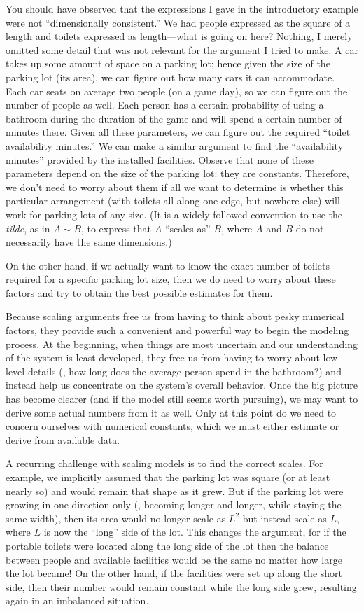 You should have observed that the expressions I gave in the
introductory example were not ``dimensionally consistent.'' We had
people expressed\vadjust{\pagebreak} as the square of a length and toilets expressed as
length---what is going on here?  Nothing, I merely omitted some detail
that was not relevant for the argument I tried to make. A car takes up
some amount of space on a parking lot; hence given the size of the
parking lot (its area), we can figure out how many cars it can
accommodate.  Each car seats on average two people (on a game day), so
we can figure out the number of people as well. Each person has a
certain probability of using a bathroom during the duration of the
game and will spend a certain number of minutes there. Given all these
parameters, we can figure out the required ``toilet availability
minutes.'' We can make a similar argument to find the ``availability
minutes'' provided by the installed facilities. Observe that none of
these parameters depend on the size of the parking lot: they are
constants. Therefore, we don't need to worry about them if all we want
to determine is whether this particular arrangement (with toilets all
along one edge, but nowhere else) will work for parking lots of any
size. (It is a widely followed convention to use the \emph{tilde}, as
in $A \sim B$, to express that $A$ ``scales as'' $B$, where $A$ and
$B$ do not necessarily have the same dimensions.)

On the other hand, if we actually want to know the exact number of
toilets required for a specific parking lot size, then we do need to
worry about these factors and try to obtain the best possible
estimates for them.

Because scaling arguments free us from having to think about pesky
numerical factors, they provide such a convenient and powerful way to
begin the modeling process. At the beginning, when things are most
uncertain and our understanding of the system is least developed, they
free us from having to worry about low-level details (\eg, how long
does the average person spend in the bathroom?) and instead help us
concentrate on the system's overall behavior. Once the big picture has
become clearer (and if the model still seems worth pursuing), we may
want to derive some actual numbers from it as well. Only at this point
do we need to concern ourselves with numerical constants, which we
must either estimate or derive from available data.

A recurring challenge with scaling models is to find the correct
scales. For example, we implicitly assumed that the parking lot was
square (or at least nearly so) and would remain that shape as it grew.
But if the parking lot were growing in one direction only (\ie,
becoming longer and longer, while staying the same width), then its
area would no longer scale as $L^2$ but instead scale as $L$, where
$L$ is now the ``long'' side of the lot. This changes the argument, for
if the portable toilets were located along the long side of the lot
then the balance between people and available facilities would be the
same no matter how large the lot became! On the other hand, if the
facilities were set up along the short side, then their number would
remain constant while the long side grew, resulting again in an
imbalanced situation.

